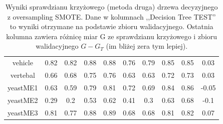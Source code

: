 \begin{table}[h]
\begin{center}
{\begin{tabular}{|c|c|c|c|c|c|c|c|c|c|}
			vehicle&0.82&0.82&0.88&0.88&0.76&0.79&0.85&0.85&0.03\\%
			vertebal&0.66&0.68&0.75&0.76&0.63&0.63&0.72&0.73&0.03\\%
			yeastME1&0.63&0.59&0.79&0.81&0.72&0.69&0.84&0.86&{-}0.05\\%
			yeastME2&0.29&0.2&0.53&0.62&0.41&0.3&0.63&0.68&{-}0.1\\%
			yeastME3&0.81&0.77&0.88&0.89&0.68&0.68&0.81&0.82&0.07\\%
			\hline%
		\end{tabular}}%
			\caption[Wyniki sprawdzianu krzyżowego z metodą SMOTE, metoda druga]{Wyniki sprawdzianu krzyżowego (metoda druga) drzewa decyzyjnego z oversampling SMOTE. Dane w kolumnach ,,Decision Tree TEST'' to wyniki otrzymane na podstawie zbioru walidacyjnego. Ostatnia kolumna zawiera różnicę  miar G ze sprawdzianu krzyżowego i zbioru walidacyjnego $G-G_T$ (im bliżej zera tym lepiej).}
			\label{CVoversampling2}
	\end{center}
\end{table}